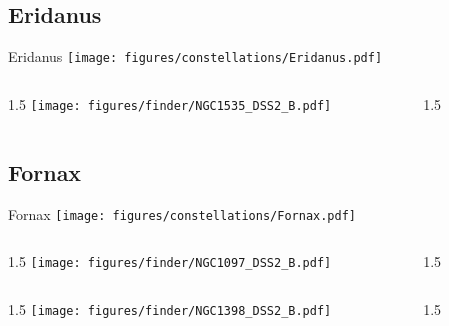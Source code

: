 \documentclass[final]{beamer}
\newlength{\colwidth}
\begin{document}
\subsection{Eridanus}

\begin{frame}[t]{\LARGE Eridanus}
  \centering
  \texttt{[image: figures/constellations/Eridanus.pdf]}
\end{frame}


\begin{frame}[t]{}
  \begin{columns}[T]
    \begin{column}{1.5\colwidth}
      \centering
      \texttt{[image: figures/finder/NGC1535\_DSS2\_B.pdf]}
    \end{column}
    \begin{column}{1.5\colwidth}
      \Large
      
    \end{column}
  \end{columns}
  \vspace{\fill}
\end{frame}

\subsection{Fornax}

\begin{frame}[t]{\LARGE Fornax}
  \centering
  \texttt{[image: figures/constellations/Fornax.pdf]}
\end{frame}


\begin{frame}[t]{}
  \begin{columns}[T]
    \begin{column}{1.5\colwidth}
      \centering
      \texttt{[image: figures/finder/NGC1097\_DSS2\_B.pdf]}
    \end{column}
    \begin{column}{1.5\colwidth}
      \Large
      
    \end{column}
  \end{columns}
  \vspace{\fill}
  \begin{columns}[T]
    \begin{column}{1.5\colwidth}
      \centering
      \texttt{[image: figures/finder/NGC1398\_DSS2\_B.pdf]}
    \end{column}
    \begin{column}{1.5\colwidth}
      \Large
      
    \end{column}
  \end{columns}
\end{frame}
\end{document}

